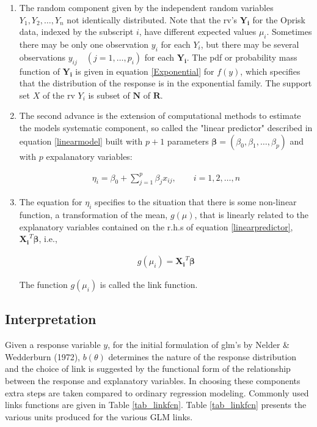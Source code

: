 \documentclass{DissertateUSU}
\begin{document}
\begin{enumerate}
\item The random component given by the independent random variables $Y_1, Y_2, \ldots, Y_n $ not identically distributed. Note that the rv's $\mathbf{Y_i}$ for the Oprisk data, indexed by the subscript $i$, have different expected values $\mu_i$. Sometimes there may be only one observation $y_i$ for each $Y_i$, but there may be several observations $y_{ij} \quad (j=1,\ldots,p_i)$ for each $\mathbf{Y_i}$. The pdf or probability mass function of $\mathbf{Y_i}$ is given in equation \ref{Exponential} for $f(y)$, which specifies that the distribution of the response is in the exponential family. The support set $X$ of the rv $Y_i$ is subset of $\mathbf{N}$ of $\mathbf{R}$. 

\item The second advance is the extension of computational methods to estimate the models systematic component, so called the "linear predictor" described in equation \ref{linearmodel} built with $p+1$ parameters $\mathbf{\beta} = (\beta_0,\beta_1,\ldots,\beta_p)$ and with $p$ expalanatory variables:

\singlespacing
\begin{eqnarray}\label{linearpredictor}
\eta_i = \beta_0 + \sum_{j=1}^{p}\beta_jx_{ij}, \qquad i = 1,2,\ldots,n
\end{eqnarray}
\doublespacing

\item The equation for $\eta_i$ specifies to the situation that there is some non-linear function, a transformation of the mean, $g(\mu)$, that is linearly related to the explanatory variables contained on the r.h.s of equation \ref{linearpredictor}, $\mathbf{X_i}^T\mathbf{\beta}$, i.e.,

\singlespacing
\begin{eqnarray}
g(\mu_i) = \mathbf{X_i}^T\mathbf{\beta}
\end{eqnarray}
\doublespacing

The function $g(\mu_i)$ is called the link function.
\end{enumerate}

\subsection{Interpretation}

Given a response variable \(y\), for the initial formulation of glm's by
Nelder \& Wedderburn (1972), \(b(\theta)\) determines the nature of the
response distribution and the choice of link is suggested by the
functional form of the relationship between the response and explanatory
variables. In choosing these components extra steps are taken compared
to ordinary regression modeling. Commonly used links functions are given
in Table \ref{tab_linkfcn}. Table \ref{tab_linkfcn} presents the various
units produced for the various GLM links.
\end{document}
